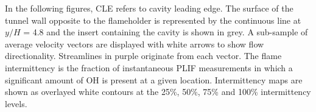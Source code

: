 In the following figures, CLE refers to cavity leading edge. The surface of the tunnel wall opposite to the flameholder is represented by the continuous line at $y/H$ = 4.8 and the insert containing the cavity is shown in grey. A sub-sample of average velocity vectors are displayed with white arrows to show flow directionality. Streamlines in purple originate from each vector.
The flame intermittency is the fraction of instantaneous PLIF measurements in which a significant amount of OH is present at a given location. Intermittency maps are shown as overlayed white contours at the 25\%, 50\%, 75\% and 100\% intermittency levels.
